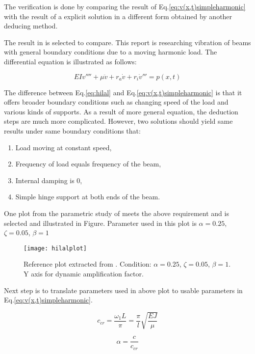 \begin{appendices}
The verification is done by comparing the result of Eq.\ref{eq:v(x,t)simpleharmonic} with the result of a explicit solution in a different form obtained by another deducing method.  

The result in \citet{abu2000vibration} is selected to compare. This report is researching vibration of beams with general boundary conditions due to a moving harmonic load. The differential equation is illustrated as follows:

\begin{equation}\label{eq:hilal}
    EIv''''+\mu \ddot{v} + r_a \dot{v}+r_i \dot{v}''' = p(x,t)
\end{equation}

The difference between Eq.\ref{eq:hilal} and Eq.\ref{eq:v(x,t)simpleharmonic} is that it offers broader boundary conditions such as changing speed of the load and various kinds of supports. As a result of more general equation, the deduction steps are much more complicated. However, two solutions should yield same results under same boundary conditions that:

\begin{enumerate}
    \item Load moving at constant speed,
    \item Frequency of load equals frequency of the beam,
    \item Internal damping is 0,
    \item Simple hinge support at both ends of the beam.
\end{enumerate}

One plot from the parametric study of \citet{abu2000vibration} meets the above requirement and is selected and illustrated in Figure. Parameter used in this plot is $\alpha = 0.25$, $\zeta = 0.05$, $\beta  = 1$

\begin{figure}[h!]
    \centering
    \texttt{[image: hilalplot]}
    \caption{Reference plot extracted from \citet{abu2000vibration}. Condition: $\alpha = 0.25$, $\zeta = 0.05$, $\beta  = 1$. Y axis for dynamic amplification factor.}
    \label{fig:hilalplot}
\end{figure}

Next step is to translate parameters used in above plot to usable parameters in Eq.\ref{eq:v(x,t)simpleharmonic}.


$$c_{cr} = \frac{\omega_1 L}{\pi} = \frac{\pi}{l}\sqrt{\frac{EJ}{\mu}}$$

$$\alpha = \frac{c}{c_{cr}}$$


\end{appendices}
